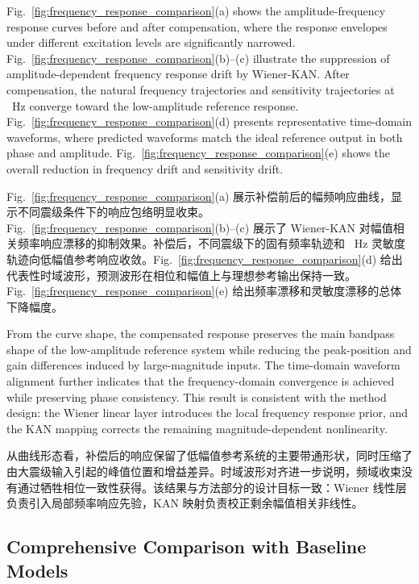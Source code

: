 \documentclass[sn-nature]{sn-jnl}
\newif\ifCNENEnglish
\newif\ifCNENBilingual
\newcommand{\CNEN}[2]{%
    \ifCNENBilingual
        #1%
        \if\relax\detokenize{#2}\relax\else\par #2\fi%
    \else
        \ifCNENEnglish
            #2%
        \else
            #1%
        \fi
    \fi
}
\begin{document}
\CNEN{Fig.~\ref{fig:frequency_response_comparison}(a) 展示补偿前后的幅频响应曲线，显示不同震级条件下的响应包络明显收束。Fig.~\ref{fig:frequency_response_comparison}(b)--(c) 展示了 Wiener-KAN 对幅值相关频率响应漂移的抑制效果。补偿后，不同震级下的固有频率轨迹和 \valSensitivityCompareFreq~Hz 灵敏度轨迹向低幅值参考响应收敛。Fig.~\ref{fig:frequency_response_comparison}(d) 给出代表性时域波形，预测波形在相位和幅值上与理想参考输出保持一致。Fig.~\ref{fig:frequency_response_comparison}(e) 给出频率漂移和灵敏度漂移的总体下降幅度。}{Fig.~\ref{fig:frequency_response_comparison}(a) shows the amplitude-frequency response curves before and after compensation, where the response envelopes under different excitation levels are significantly narrowed. Fig.~\ref{fig:frequency_response_comparison}(b)--(c) illustrate the suppression of amplitude-dependent frequency response drift by Wiener-KAN. After compensation, the natural frequency trajectories and sensitivity trajectories at \valSensitivityCompareFreq~Hz converge toward the low-amplitude reference response. Fig.~\ref{fig:frequency_response_comparison}(d) presents representative time-domain waveforms, where predicted waveforms match the ideal reference output in both phase and amplitude. Fig.~\ref{fig:frequency_response_comparison}(e) shows the overall reduction in frequency drift and sensitivity drift.%
}

\CNEN{从曲线形态看，补偿后的响应保留了低幅值参考系统的主要带通形状，同时压缩了由大震级输入引起的峰值位置和增益差异。时域波形对齐进一步说明，频域收束没有通过牺牲相位一致性获得。该结果与方法部分的设计目标一致：Wiener 线性层负责引入局部频率响应先验，KAN 映射负责校正剩余幅值相关非线性。}{From the curve shape, the compensated response preserves the main bandpass shape of the low-amplitude reference system while reducing the peak-position and gain differences induced by large-magnitude inputs. The time-domain waveform alignment further indicates that the frequency-domain convergence is achieved while preserving phase consistency. This result is consistent with the method design: the Wiener linear layer introduces the local frequency response prior, and the KAN mapping corrects the remaining magnitude-dependent nonlinearity.}

\subsection{Comprehensive Comparison with Baseline Models}
\end{document}
